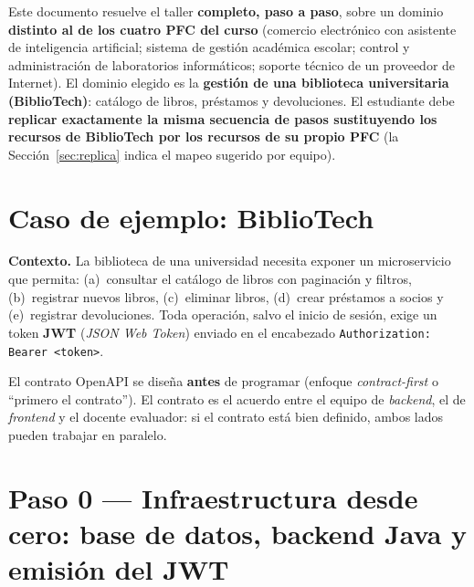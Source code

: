 \documentclass[11pt,a4paper]{article}
\begin{document}
Este documento resuelve el taller \textbf{completo, paso a paso}, sobre un dominio \textbf{distinto al de los cuatro PFC del curso} (comercio electrónico con asistente de inteligencia artificial; sistema de gestión académica escolar; control y administración de laboratorios informáticos; soporte técnico de un proveedor de Internet). El dominio elegido es la \textbf{gestión de una biblioteca universitaria (BiblioTech)}: catálogo de libros, préstamos y devoluciones. El estudiante debe \textbf{replicar exactamente la misma secuencia de pasos sustituyendo los recursos de BiblioTech por los recursos de su propio PFC} (la Sección~\ref{sec:replica} indica el mapeo sugerido por equipo).

\section{Caso de ejemplo: BiblioTech}

\textbf{Contexto.} La biblioteca de una universidad necesita exponer un microservicio que permita: (a)~consultar el catálogo de libros con paginación y filtros, (b)~registrar nuevos libros, (c)~eliminar libros, (d)~crear préstamos a socios y (e)~registrar devoluciones. Toda operación, salvo el inicio de sesión, exige un token \textbf{JWT} (\textit{JSON Web Token}) enviado en el encabezado \texttt{Authorization: Bearer <token>}.

\begin{cajanota}
El contrato OpenAPI se diseña \textbf{antes} de programar (enfoque \textit{contract-first} o ``primero el contrato''). El contrato es el acuerdo entre el equipo de \textit{backend}, el de \textit{frontend} y el docente evaluador: si el contrato está bien definido, ambos lados pueden trabajar en paralelo.
\end{cajanota}

\section{Paso 0 --- Infraestructura desde cero: base de datos, backend Java y emisión del JWT}\label{sec:paso0}
\end{document}
